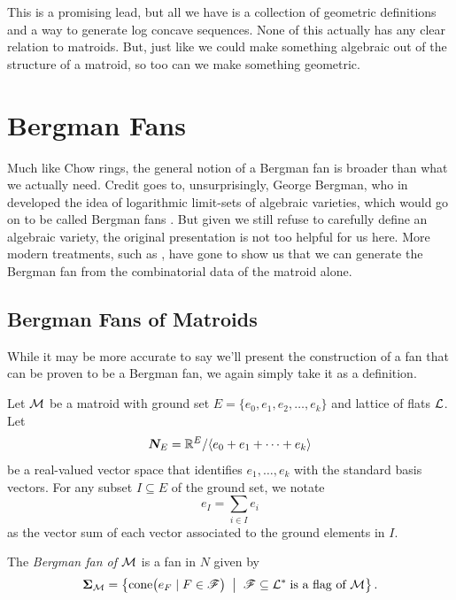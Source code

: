 \documentclass[12pt,oneside]{../../sfsuthesis}
\begin{document}
This is a promising lead, but all we have is a collection of geometric definitions and a way to generate log concave sequences.
None of this actually has any clear relation to matroids.
But, just like we could make something algebraic out of the structure of a matroid, so too can we make something geometric.

\section{Bergman Fans}
Much like Chow rings, the general notion of a Bergman fan is broader than what we actually need.
Credit goes to, unsurprisingly, George Bergman, who in \cite{bergmanLogarithmicLimitsetAlgebraic1971} developed the idea of logarithmic limit-sets of algebraic varieties, which would go on to be called Bergman fans \cite{feichtnerMatroidPolytopesNested2005}.
But given we still refuse to carefully define an algebraic variety, the original presentation is not too helpful for us here.
More modern treatments, such as \cite{ardilaBergmanComplexMatroid2006,huhLogconcavityCharacteristicPolynomials2012}, have gone to show us that we can generate the Bergman fan from the combinatorial data of the matroid alone.

\subsection{Bergman Fans of Matroids}
While it may be more accurate to say we'll present the construction of a fan that can be proven to be a Bergman fan, we again simply take it as a definition.

\begin{definition}\th\label{def:bergmanFan}
    Let \( \mathcal{M} \) be a matroid with ground set \( E = \{ e_0, e_1, e_2, \dots, e_k \} \) and lattice of flats \( \mathcal{L} \).
    Let
    \[
        \bm{N}_E = \mathbb{R}^{E}/\langle e_0 + e_1 + \cdots + e_k \rangle
    \]
    be a real-valued vector space that identifies \( e_1, \dots, e_k \) with the standard basis vectors.
    For any subset \( I \subseteq E \) of the ground set, we notate
    \[
        e_I = \sum_{i \in I} e_i
    \]
    as the vector sum of each vector associated to the ground elements in \( I \).

    The \emph{Bergman fan of \( \mathcal{M} \)} is a fan in \( N \) given by
    \[
        \bm{\Sigma}_{\mathcal{M}} = \left\{
        \mathrm{cone}\big( e_F \; | \; F \in \mathscr{F} \big)
        \;\; \middle| \;\;
        \mathscr{F} \subseteq \mathcal{L}^\ast \; \text{is a flag of \(\mathcal{M}\)}
        \right\}.
    \]
\end{definition}
\end{document}
